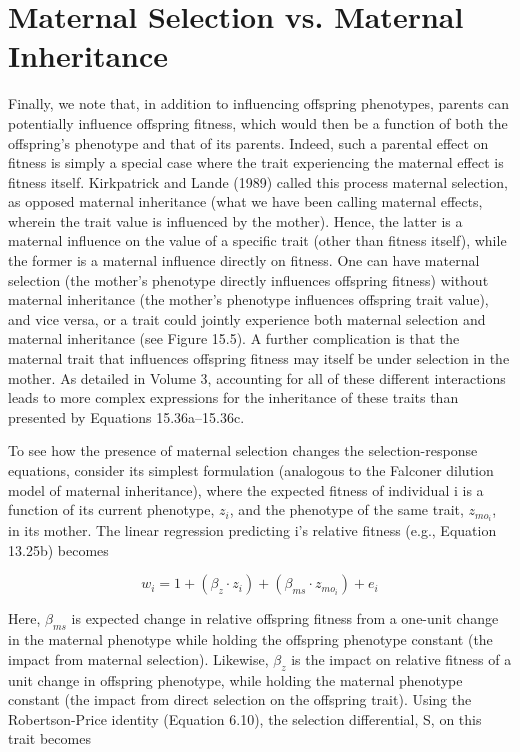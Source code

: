 \documentclass{article}
\begin{document}
\section{Maternal Selection vs. Maternal Inheritance}
Finally, we note that, in addition to influencing offspring phenotypes, parents can potentially influence offspring fitness, which would then be a function of both the offspring's phenotype and that of its parents. Indeed, such a parental effect on fitness is simply a special case where the trait experiencing the maternal effect is fitness itself. Kirkpatrick and Lande (1989) called this process maternal selection, as opposed maternal inheritance (what we have been calling maternal effects, wherein the trait value is influenced by the mother). Hence, the latter is a maternal influence on the value of a specific trait (other than fitness itself), while the former is a maternal influence directly on fitness. One can have maternal selection (the mother's phenotype directly influences offspring fitness) without maternal inheritance (the mother's phenotype influences offspring trait value), and vice versa, or a trait could jointly experience both maternal selection and maternal inheritance (see Figure 15.5). A further complication is that the maternal trait that influences offspring fitness may itself be under selection in the mother. As detailed in Volume 3, accounting for all of these different interactions leads to more complex expressions for the inheritance of these traits than presented by Equations 15.36a–15.36c.

To see how the presence of maternal selection changes the selection-response equations, consider its simplest formulation (analogous to the Falconer dilution model of maternal inheritance), where the expected fitness of individual i is a function of its current phenotype,  $ z_{i} $, and the phenotype of the same trait,  $ z_{mo_{i}} $, in its mother. The linear regression predicting i's relative fitness (e.g., Equation 13.25b) becomes

\begin{equation}
w_{i}=1+\left(\beta_{z}\cdot z_{i}\right)+\left(\beta_{m s}\cdot z_{m o_{i}}\right)+e_{i}
\tag{15.39a}
\label{eq:15_39a}
\end{equation}

Here,  $ \beta_{ms} $ is expected change in relative offspring fitness from a one-unit change in the maternal phenotype while holding the offspring phenotype constant (the impact from maternal selection). Likewise,  $ \beta_{z} $ is the impact on relative fitness of a unit change in offspring phenotype, while holding the maternal phenotype constant (the impact from direct selection on the offspring trait). Using the Robertson-Price identity (Equation 6.10), the selection differential, S, on this trait becomes
\end{document}
